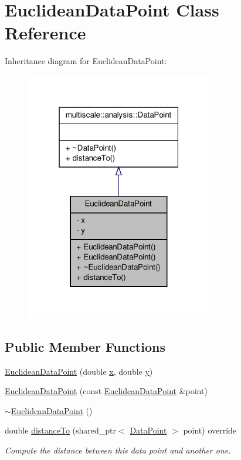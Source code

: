 \hypertarget{classEuclideanDataPoint}{\section{\-Euclidean\-Data\-Point \-Class \-Reference}
\label{classEuclideanDataPoint}
}


\-Inheritance diagram for \-Euclidean\-Data\-Point\-:\nopagebreak
\begin{figure}[H]
\begin{center}
\leavevmode
\includegraphics[width=232pt]{classEuclideanDataPoint__inherit__graph}
\end{center}
\end{figure}
\subsection*{\-Public \-Member \-Functions}
\begin{DoxyCompactItemize}
\item 
\hyperlink{classEuclideanDataPoint_acda27e957f18603d1b790d037ab5b74a}{\-Euclidean\-Data\-Point} (double \hyperlink{classEuclideanDataPoint_a7d3a3555621c6fd195f2f0543e04eaf6}{x}, double \hyperlink{classEuclideanDataPoint_a108d29336be8bf0bd1aa53c40df3bd68}{y})
\item 
\hyperlink{classEuclideanDataPoint_a8037034faddfd74eb85f7879bb8e7e06}{\-Euclidean\-Data\-Point} (const \hyperlink{classEuclideanDataPoint}{\-Euclidean\-Data\-Point} \&point)
\item 
\hyperlink{classEuclideanDataPoint_a8ee5a1033aba4baa58692f0ae896fbf8}{$\sim$\-Euclidean\-Data\-Point} ()
\item 
double \hyperlink{classEuclideanDataPoint_a86ac3981ea67375c7854e9d84446f8e5}{distance\-To} (shared\-\_\-ptr$<$ \hyperlink{classmultiscale_1_1analysis_1_1DataPoint}{\-Data\-Point} $>$ point) override
\begin{DoxyCompactList}\small\item\em \-Compute the distance between this data point and another one. \end{DoxyCompactList}\end{DoxyCompactItemize}
